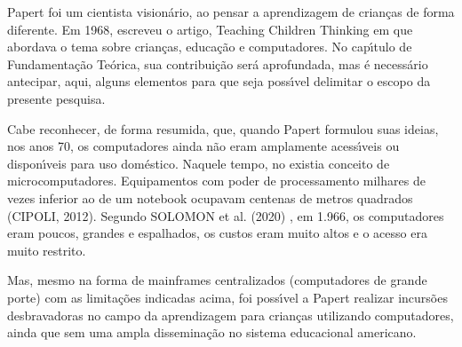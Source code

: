 \documentclass[
12pt,		%
openright,	%
twoside,  %
a4paper,			%
chapter=TITLE,		%
english,			%
french,				%
spanish,			%
brazil				%
]{USPSC-classe/USPSC}
\begin{document}
Papert foi um cientista vision\'ario, ao pensar a aprendizagem de crian\c{c}as de forma diferente. Em 1968, escreveu o artigo, \textquotedbl  Teaching Children Thinking \textquotedbl   em que abordava  o tema sobre crian\c{c}as, educa\c{c}\~ao e computadores. No cap\'{\i}tulo de Fundamenta\c{c}\~ao Te\'orica, sua contribui\c{c}\~ao ser\'a aprofundada, mas \'e necess\'ario antecipar, aqui, alguns elementos para que seja poss\'{\i}vel delimitar o escopo da presente pesquisa.

















Cabe reconhecer, de forma resumida, que, quando Papert formulou suas ideias, nos anos 70, os computadores ainda n\~ao eram amplamente acess\'{\i}veis ou dispon\'{\i}veis para uso dom\'estico. Naquele tempo, no existia conceito de \textquotedbl microcomputadores\textquotedbl . Equipamentos com poder de processamento milhares de vezes inferior ao de um notebook ocupavam centenas de metros quadrados  (CIPOLI, 2012). Segundo  SOLOMON et al. (2020) , \textquotedbl em 1.966, os computadores eram poucos, grandes e espalhados\textquotedbl , os custos eram muito altos e o acesso era muito restrito.

















Mas, mesmo na forma de mainframes centralizados (computadores de grande porte) com as limita\c{c}\~oes indicadas acima, foi poss\'{\i}vel a Papert realizar incurs\~oes desbravadoras no campo da aprendizagem para crian\c{c}as utilizando computadores, ainda que sem uma ampla dissemina\c{c}\~ao no sistema educacional americano.
\end{document}
